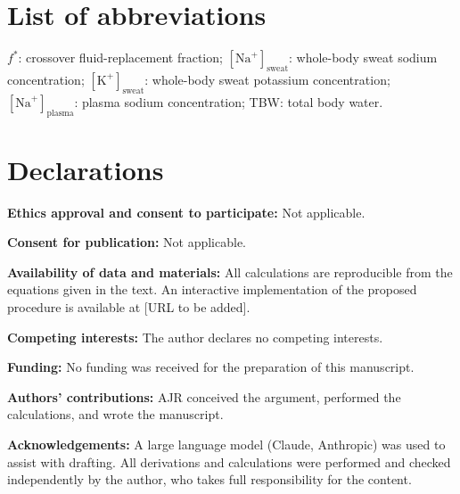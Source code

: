 \documentclass[11pt,a4paper]{article}
\newcommand{\Na}{[\mathrm{Na}^{+}]}
\newcommand{\K}{[\mathrm{K}^{+}]}
\newcommand{\fstar}{f^{*}}
\begin{document}
\section*{List of abbreviations}

$\fstar$: crossover fluid-replacement fraction; $\Na_{\mathrm{sweat}}$: whole-body sweat sodium concentration; $\K_{\mathrm{sweat}}$: whole-body sweat potassium concentration; $\Na_{\mathrm{plasma}}$: plasma sodium concentration; TBW: total body water.

\section*{Declarations}

\textbf{Ethics approval and consent to participate:} Not applicable.

\textbf{Consent for publication:} Not applicable.

\textbf{Availability of data and materials:} All calculations are reproducible from the equations given in the text. An interactive implementation of the proposed procedure is available at [URL to be added].

\textbf{Competing interests:} The author declares no competing interests.

\textbf{Funding:} No funding was received for the preparation of this manuscript.

\textbf{Authors' contributions:} AJR conceived the argument, performed the calculations, and wrote the manuscript.

\textbf{Acknowledgements:} A large language model (Claude, Anthropic) was used to assist with drafting. All derivations and calculations were performed and checked independently by the author, who takes full responsibility for the content.
\end{document}
